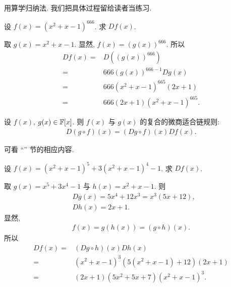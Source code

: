 \begin{pf}
    用算学归纳法. 我们把具体过程留给读者当练习.
\end{pf}

\begin{example}
    设 $f(x) = (x^2 + x - 1)^{666}$. 求 $Df(x)$.

    取 $g(x) = x^2 + x - 1$. 显然, $f(x) = (g(x))^{666}$. 所以
    \begin{align*}
        Df(x)
        = {} & D((g(x))^{666})                   \\
        = {} & 666 (g(x))^{666 - 1} Dg(x)        \\
        = {} & 666 (x^2 + x - 1)^{665} (2x + 1)  \\
        = {} & 666 (2x + 1) (x^2 + x - 1)^{665}.
    \end{align*}
\end{example}

\begin{proposition}
    设 $f(x)$, $g(x) \in \mathbb{F}[x]$. 则 $f(x)$ 与 $g(x)$ 的复合的微商适合链规则:
    \begin{align*}
        D(g \circ f) (x) = (Dg \circ f)(x) Df (x).
    \end{align*}
\end{proposition}

\begin{pf}
    可看 ``\Derivatives'' 节的相应内容.
\end{pf}

\begin{example}
    设 $f(x) = (x^2 + x - 1)^5 + 3 (x^2 + x - 1)^4 - 1$. 求 $Df(x)$.

    取 $g(x) = x^5 + 3x^4 - 1$ 与 $h(x) = x^2 + x - 1$. 则
    \begin{align*}
         & Dg(x) = 5x^4 + 12x^3 = x^3 (5x + 12), \\
         & Dh(x) = 2x + 1.
    \end{align*}
    显然,
    \begin{align*}
        f(x) = g(h(x)) = (g \circ h) (x).
    \end{align*}
    所以
    \begin{align*}
        Df(x)
        = {} & (Dg \circ h)(x) Dh(x)                          \\
        = {} & (x^2 + x - 1)^3 (5(x^2 + x - 1) + 12) (2x + 1) \\
        = {} & (2x + 1) (5x^2 + 5x + 7) (x^2 + x - 1)^3.
    \end{align*}
\end{example}
